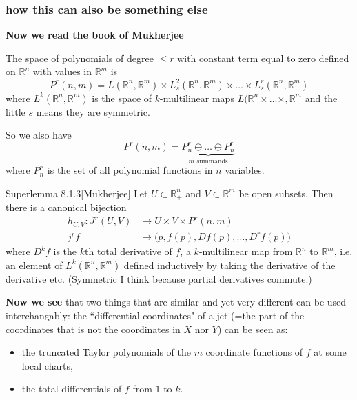 \subsubsection{how this can also be something else}
\textbf{Now we read the book of Mukherjee}


The space of polynomials of degree \(\leq r\) with constant term equal to zero defined on \(\mathbb{R}^n\) with values in \(\mathbb{R}^m\) is
\[P^r(n,m)=L(\mathbb{R}^n,\mathbb{R}^m)\times L^2_s(\mathbb{R}^n,\mathbb{R}^m) \times \ldots \times L^r_s(\mathbb{R}^n,\mathbb{R}^m)\]
where \(L^k(\mathbb{R}^n,\mathbb{R}^m)\) is the space of \(k\)-multilinear maps \(L(\mathbb{R}^n\times \ldots\times, \mathbb{R}^m\) and the little \(s\) means they are symmetric.

So we also have
\[P^r(n,m)=\underbrace{P^r_n \oplus  \ldots \oplus  P^r_n}_{\text{\(m\) summands} }\]
where \(P^r_n\) is the set of all polynomial functions in \(n\) variables.

\begin{thing2}{Superlemma 8.1.3}[Mukherjee]\leavevmode
Let \(U\subset \mathbb{R}^n_+\) and \(V \subset \mathbb{R}^m\) be open subsets. Then there is a canonical bijection
\begin{align*}
	 h_{U,V}: J^{r}(U,V) &\longrightarrow U \times V \times P^r(n,m)\\
	 j^rf&\longmapsto \Big(p,f(p),Df(p), \ldots, D^r f(p)\Big)
\end{align*}
where \(D^kf\) is the \(k\)th total derivative of \(f\), a \(k\)-multilinear map from \( \mathbb{R}^n\) to \(\mathbb{R}^m\), i.e. an element of \(L^k(\mathbb{R}^n,\mathbb{R}^m)\) defined inductively by taking the derivative of the derivative etc. (Symmetric I think because partial derivatives commute.)


\vspace{4em}
{\color{6}\bfseries Now we see}\hspace{.5em} that two things that are similar and yet very different can be used interchangably: the ``differential coordinates" of a jet (=the part of the coordinates that is not the coordinates in \(X\) nor \(Y\)) can be seen as:
\begin{itemize}
\item the truncated Taylor polynomials of the \(m\) coordinate functions of \(f\) at some  local charts,
\item the total differentials of \(f\) from \(1\) to \(k\).
\end{itemize}

\end{thing2}

